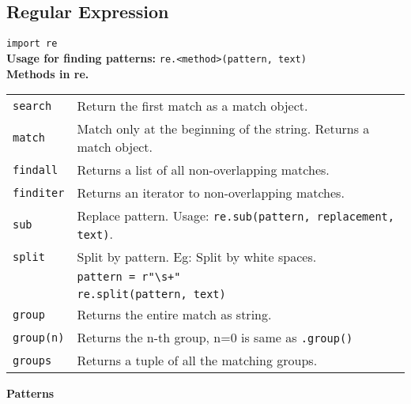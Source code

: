 \columnbreak


\subsection*{Regular Expression}

\texttt{import re}\\
\textbf{Usage for finding patterns:} \texttt{re.<method>(pattern, text)}\\

\textbf{Methods in re.}\\
\begin{tabularx}{\linewidth}{lX}
    \texttt{search}         & Return the first match as a match object.\\
    \texttt{match}          & Match only at the beginning of the string. Returns a match object.\\
    \texttt{findall}        & Returns a list of all non-overlapping matches.\\
    \texttt{finditer}       & Returns an iterator to non-overlapping matches.\\
    \texttt{sub}            & Replace pattern. Usage: \texttt{re.sub(pattern, replacement, text)}.\\
    \texttt{split}          & Split by pattern. Eg: Split by white spaces.\\
                            & \texttt{pattern = r"\textbackslash s+"}\\
                            & \texttt{re.split(pattern, text)}\\
    \texttt{group}          & Returns the entire match as string.\\
    \texttt{group(n)}       & Returns the n-th group, n=0 is same as \texttt{.group()}\\
    \texttt{groups}         & Returns a tuple of all the matching groups.\\
\end{tabularx}

\textbf{Patterns}

